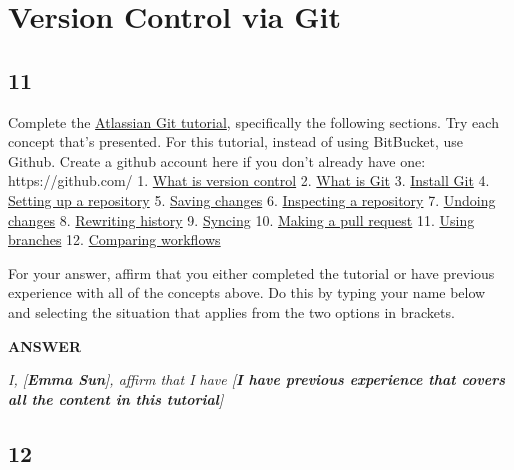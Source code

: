 \documentclass[11pt]{article}
\begin{document}
    \section{Version Control via Git}\label{version-control-via-git}

    \subsection{11}\label{section}

Complete the
\href{https://www.atlassian.com/git/tutorials/what-is-version-control}{Atlassian
Git tutorial}, specifically the following sections. Try each concept
that's presented. For this tutorial, instead of using BitBucket, use
Github. Create a github account here if you don't already have one:
https://github.com/ 1.
\href{https://www.atlassian.com/git/tutorials/what-is-version-control}{What
is version control} 2.
\href{https://www.atlassian.com/git/tutorials/what-is-git}{What is Git}
3. \href{https://www.atlassian.com/git/tutorials/install-git}{Install
Git} 4.
\href{https://www.atlassian.com/git/tutorials/install-git}{Setting up a
repository} 5.
\href{https://www.atlassian.com/git/tutorials/saving-changes}{Saving
changes} 6.
\href{https://www.atlassian.com/git/tutorials/inspecting-a-repository}{Inspecting
a repository} 7.
\href{https://www.atlassian.com/git/tutorials/undoing-changes}{Undoing
changes} 8.
\href{https://www.atlassian.com/git/tutorials/rewriting-history}{Rewriting
history} 9.
\href{https://www.atlassian.com/git/tutorials/syncing}{Syncing} 10.
\href{https://www.atlassian.com/git/tutorials/making-a-pull-request}{Making
a pull request} 11.
\href{https://www.atlassian.com/git/tutorials/using-branches}{Using
branches} 12.
\href{https://www.atlassian.com/git/tutorials/comparing-workflows}{Comparing
workflows}

For your answer, affirm that you either completed the tutorial or have
previous experience with all of the concepts above. Do this by typing
your name below and selecting the situation that applies from the two
options in brackets.

    \textbf{ANSWER}

\emph{I, {[}\textbf{Emma Sun}{]}, affirm that I have {[}\textbf{I have
previous experience that covers all the content in this tutorial}{]}}

    \subsection{12}\label{section}
\end{document}
